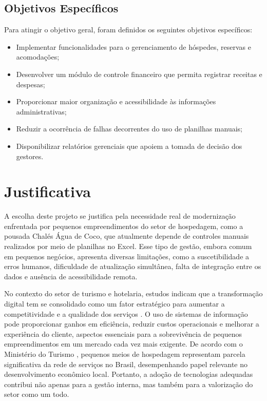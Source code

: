\documentclass[
	12pt,				%
	openany,			%
	oneside,			%
	a4paper,			%
	english,			%
	french,				%
	spanish,			%
	brazil				%
	]{abntex2}
\begin{document}
\subsection{Objetivos Específicos}
Para atingir o objetivo geral, foram definidos os seguintes objetivos específicos:
\begin{itemize}
	\item Implementar funcionalidades para o gerenciamento de hóspedes, reservas e acomodações;
	\item Desenvolver um módulo de controle financeiro que permita registrar receitas e despesas;
	\item Proporcionar maior organização e acessibilidade às informações administrativas;
	\item Reduzir a ocorrência de falhas decorrentes do uso de planilhas manuais;
	\item Disponibilizar relatórios gerenciais que apoiem a tomada de decisão dos gestores.
\end{itemize}

\section{Justificativa}

A escolha deste projeto se justifica pela necessidade real de modernização enfrentada por pequenos empreendimentos do setor de hospedagem, como a pousada Chalés Água de Coco, que atualmente depende de controles manuais realizados por meio de planilhas no Excel. Esse tipo de gestão, embora comum em pequenos negócios, apresenta diversas limitações, como a suscetibilidade a erros humanos, dificuldade de atualização simultânea, falta de integração entre os dados e ausência de acessibilidade remota.

No contexto do setor de turismo e hotelaria, estudos indicam que a transformação digital tem se consolidado como um fator estratégico para aumentar a competitividade e a qualidade dos serviços \cite{laudon2020sistemas,stair2020principios}. O uso de sistemas de informação pode proporcionar ganhos em eficiência, reduzir custos operacionais e melhorar a experiência do cliente, aspectos essenciais para a sobrevivência de pequenos empreendimentos em um mercado cada vez mais exigente. De acordo com o Ministério do Turismo \cite{mtur}, pequenos meios de hospedagem representam parcela significativa da rede de serviços no Brasil, desempenhando papel relevante no desenvolvimento econômico local. Portanto, a adoção de tecnologias adequadas contribui não apenas para a gestão interna, mas também para a valorização do setor como um todo.
\end{document}
